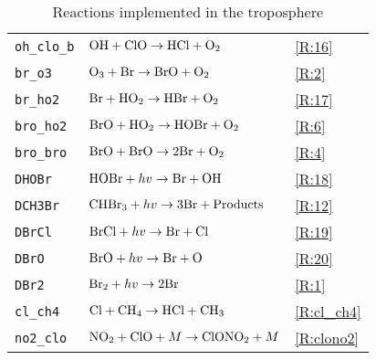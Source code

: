 \begin{table}[ht]
{\begin{tabular}{|l|l|l|}
\texttt{oh\_clo\_b} & $\mathrm{OH} + \mathrm{ClO} \rightarrow \mathrm{HCl} + \mathrm{O_2}$                              & \ref{R:16}\\
\texttt{br\_o3}     & $\mathrm{O_3} + \mathrm{Br} \rightarrow \mathrm{BrO} + \mathrm{O_2}$                              & \ref{R:2} \\
\texttt{br\_ho2}    & $\mathrm{Br} + \mathrm{HO_2} \rightarrow \mathrm{HBr} + \mathrm{O_2}$                             & \ref{R:17}\\
\texttt{bro\_ho2}   & $\mathrm{BrO} + \mathrm{HO_2} \rightarrow \mathrm{HOBr} + \mathrm{O_2}$                           & \ref{R:6} \\
\texttt{bro\_bro}   & $\mathrm{BrO} + \mathrm{BrO} \rightarrow 2\mathrm{Br} + \mathrm{O_2}$                             & \ref{R:4} \\
\texttt{DHOBr}      & $\mathrm{HOBr} + hv \rightarrow \mathrm{Br} + \mathrm{OH}$                                      & \ref{R:18} \\
\texttt{DCH3Br}     & $\mathrm{CHBr_3} + hv \rightarrow 3\mathrm{Br} + \mathrm{Products}$                             & \ref{R:12} \\
\texttt{DBrCl}      & $\mathrm{BrCl} + hv \rightarrow \mathrm{Br} + \mathrm{Cl}$                                      & \ref{R:19} \\
\texttt{DBrO}       & $\mathrm{BrO} + hv \rightarrow \mathrm{Br} + \mathrm{O}$                                        & \ref{R:20} \\
\texttt{DBr2}       & $\mathrm{Br_2} + hv \rightarrow 2\mathrm{Br} $                                                & \ref{R:1} \\
\texttt{cl\_ch4}    & $\mathrm{Cl} + \mathrm{CH_4} \rightarrow \mathrm{HCl} + \mathrm{CH_3} $                           & \ref{R:cl_ch4}\\
\texttt{no2\_clo}    & $\mathrm{NO_2} + \mathrm{ClO} + M \rightarrow \mathrm{ClONO_2} + M $                            & \ref{R:clono2}\\
\hline
\end{tabular}
}
\caption{Reactions implemented in the troposphere}
\label{tab:3}
\end{table}